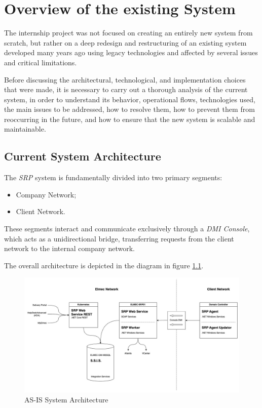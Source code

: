 \chapter{Overview of the existing System}
The internship project was not focused on creating an entirely new system from scratch, but rather on a deep redesign and restructuring of an existing system developed many years ago using legacy technologies and affected by several issues and critical limitations.

Before discussing the architectural, technological, and implementation choices that were made, it is necessary to carry out a thorough analysis of the current system, in order to understand its behavior, operational flows, technologies used, the main issues to be addressed, how to resolve them, how to prevent them from reoccurring in the future, and how to ensure that the new system is scalable and maintainable.

\section{Current System Architecture}

The \textit{SRP} system is fundamentally divided into two primary segments: 
\begin{itemize}
    \item Company Network;
    \item Client Network.
\end{itemize}

These segments interact and communicate exclusively through a \textit{DMI Console}, which acts as a unidirectional bridge, transferring requests from the client network to the internal company network. 

The overall architecture is depicted in the diagram in figure \ref{fig:as-is-system-design}.

\begin{figure}[htbp]
  \centering
  \includegraphics[width=1.0\textwidth]{images/as-is/SRP AS-IS (System Architecture).jpg}
  \caption{AS-IS System Architecture}
  \label{fig:as-is-system-design}
\end{figure}


